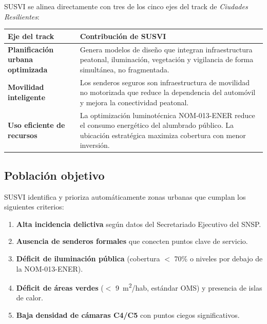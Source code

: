 \documentclass[12pt,a4paper]{article}
\begin{document}
SUSVI se alinea directamente con tres de los cinco ejes del track de \textit{Ciudades Resilientes}:

\begin{table}[H]
\centering
\small
\renewcommand{\arraystretch}{1.3}
\begin{tabularx}{\textwidth}{>{\bfseries}l X}
\toprule
\rowcolor{azuloscuro}
\color{white}\textbf{Eje del track} & \color{white}\textbf{Contribución de SUSVI} \\
\midrule
Planificación urbana optimizada & Genera modelos de diseño que integran infraestructura peatonal, iluminación, vegetación y vigilancia de forma simultánea, no fragmentada. \\
\rowcolor{fondoazul}
Movilidad inteligente & Los senderos seguros son infraestructura de movilidad no motorizada que reduce la dependencia del automóvil y mejora la conectividad peatonal. \\
Uso eficiente de recursos & La optimización luminotécnica NOM-013-ENER reduce el consumo energético del alumbrado público. La ubicación estratégica maximiza cobertura con menor inversión. \\
\bottomrule
\end{tabularx}
\end{table}

\subsection{Población objetivo}

SUSVI identifica y prioriza automáticamente zonas urbanas que cumplan los siguientes criterios:

\begin{enumerate}[label=\textbf{\arabic*.}, leftmargin=1.5cm, itemsep=4pt]
  \item \textbf{Alta incidencia delictiva} según datos del Secretariado Ejecutivo del SNSP.
  \item \textbf{Ausencia de senderos formales} que conecten puntos clave de servicio.
  \item \textbf{Déficit de iluminación pública} (cobertura $<$ 70\% o niveles por debajo de la NOM-013-ENER).
  \item \textbf{Déficit de áreas verdes} ($<$ 9~m\textsuperscript{2}/hab, estándar OMS) y presencia de islas de calor.
  \item \textbf{Baja densidad de cámaras C4/C5} con puntos ciegos significativos.
\end{enumerate}
\end{document}
